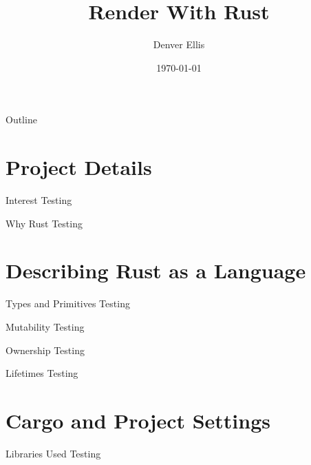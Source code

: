 \documentclass{beamer}
\title[Render With Rust]{Render With Rust}
\author{Denver Ellis}
\institute{University of Arkansas at Little Rock}
\date{\today}
\begin{document}
\maketitle
\begin{frame}{Outline}
  \tableofcontents
\end{frame}

\section{Project Details}
\begin{frame}{Interest}
    Testing
\end{frame}

\begin{frame}{Why Rust}
    Testing
\end{frame}


\section{Describing Rust as a Language}
\begin{frame}{Types and Primitives}
    Testing
\end{frame}

\begin{frame}{Mutability}
    Testing
\end{frame}

\begin{frame}{Ownership}
    Testing
\end{frame}

\begin{frame}{Lifetimes}
    Testing
\end{frame}


\section{Cargo and Project Settings}
\begin{frame}{Libraries Used}
    Testing
\end{frame}
\end{document}

